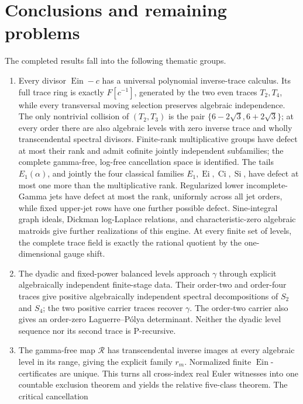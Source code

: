 \documentclass[11pt]{article}
\theoremstyle{keio}
\theoremstyle{definition}
\theoremstyle{remark}
\newcommand{\Ein}{\operatorname{Ein}}
\newcommand{\Ei}{\operatorname{Ei}}
\newcommand{\Ci}{\operatorname{Ci}}
\begin{document}
\section{Conclusions and remaining problems}
\label{sec:conclusion}

The completed results fall into the following thematic groups.
\begin{enumerate}[label=\textup{(\arabic*)}]
 \item Every divisor \(\Ein-c\) has a universal polynomial inverse-trace
 calculus.  Its full trace ring is exactly \(F[c^{-1}]\), generated by the
 two even traces \(T_2,T_4\), while every transversal moving selection
 preserves algebraic independence.  The only nontrivial collision of
 \((T_2,T_3)\) is the pair \(\{6-2\sqrt3,6+2\sqrt3\}\); at every order
 there are also algebraic levels with zero inverse trace and wholly
 transcendental spectral divisors.  Finite-rank multiplicative groups have
 defect at most their rank and admit cofinite jointly independent
 subfamilies; the complete gamma-free, log-free cancellation space is
 identified.  The tails \(E_1(\alpha)\), and jointly the four classical
 families \(E_1,\Ei,\Ci,\operatorname{Si}\), have defect at most one more
 than the multiplicative rank.  Regularized lower incomplete-Gamma jets
 have defect at most the rank, uniformly across all jet orders, while fixed
 upper-jet rows have one further possible defect.  Sine-integral graph
 ideals, Dickman log-Laplace relations, and characteristic-zero algebraic
 matroids give further realizations of this engine.  At every finite set of
 levels, the complete trace field is exactly the rational quotient by the
 one-dimensional gauge shift.
 \item The dyadic and fixed-power balanced levels approach \(\gamma\) through
 explicit algebraically independent finite-stage data.  Their order-two
 and order-four traces give positive algebraically independent spectral
 decompositions of \(S_2\) and \(S_4\); the two positive carrier traces
 recover \(\gamma\).  The order-two carrier also gives an order-zero
 Laguerre--P\'olya determinant.  Neither the dyadic level sequence nor its
 second trace is P-recursive.
 \item The gamma-free map \(\mathscr R\) has transcendental inverse images at
 every algebraic level in its range, giving the explicit family \(r_m\).
 Normalized finite \(\Ein\)-certificates are unique.  This turns all
 cross-index real Euler witnesses into one countable exclusion theorem and
 yields the relative five-class theorem.  The critical cancellation

\end{enumerate}
\end{document}

